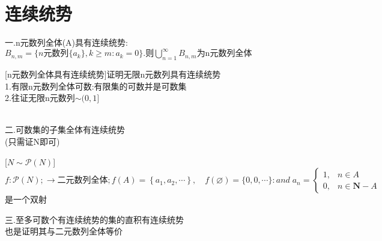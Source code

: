 \documentclass[12pt, a4paper, oneside]{ctexart}
\renewenvironment{proof}{\par\noindent{\textit{Proof:}\small}}{\\\par}
\begin{document}
\section*{连续统势}
\begin{center}
    一.n元数列全体(A)具有连续统势:
    $B_{n,m}=\{n\text{元数列}\{a_k\},k\geq m:a_k=0\}\text{.则}\bigcup\limits_{n=1}^\infty B_{n,m}\text{为n元数列全体}$\\
\end{center}
\begin{proof}[n元数列全体具有连续统势]{证明无限n元数列具有连续统势}\\
    1.有限n元数列全体可数:有限集的可数并是可数集\\
    2.往证无限n元数列$\sim (0,1]$\\
    \center{$\forall x\in (0,1],\exists !k_1.s.t.\frac{k_1-1}{n}<x \leqslant \frac{k_1}{n}$\\
    取$a_1=k_1-1$,又有唯一的$k_2,s.t.\frac{k_1-1}{n}+\frac{k_2-1}{n^2}<x \leqslant \frac{k_1-1}{n}+\frac{k_2}{n^2}$\\
    取$a_2=k_2-1$,以此类推,有:$\sum_{i=1}^m \frac{k_i-1}{n^i}<x \leqslant \sum_{i=1}^{m-1} \frac{k_i-1}{n^i}+\frac{k_m}{n^m}$\\
    令m趋近于无穷就有$x=\sum_{i=1}^{\infty} \frac{a_i}{n^i}$\\
    从而我们得到一个映射$f:(0,1]\to A:f(x)=f(x)=\left\{a_1, a_2, \cdots, a_i, \cdots\right\} .$且f是双射}
\end{proof}


\begin{center}
    二.可数集的子集全体有连续统势\\(只需证N即可)
\end{center}
\begin{proof}[$N\sim\mathcal{P}(N)$]
    $f:\mathcal{P}(N);\to \text{二元数列全体};f(A)=\left\{a_1, a_2, \cdots\right\}, \quad f(\varnothing)=\{0,0, \cdots\}:
    and\;a_n= \begin{cases}1, & n \in A \\ 0, & n \in \mathbf{N}-A\end{cases}$是一个双射
\end{proof}


\begin{center}
    三.至多可数个有连续统势的集的直积有连续统势\\
    也是证明其与二元数列全体等价
\end{center}

\end{document}
